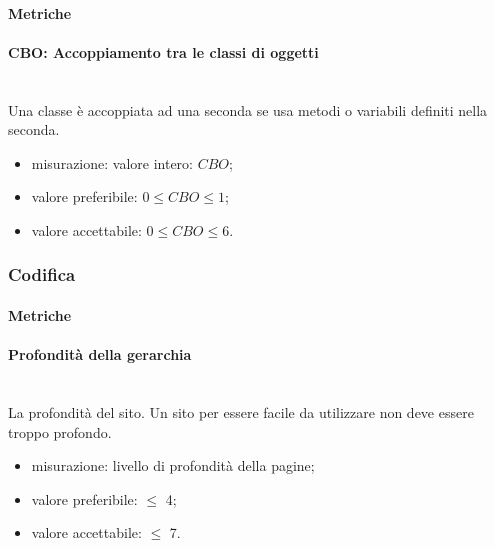 		\paragraph{Metriche}
			\paragraph*{CBO: Accoppiamento tra le classi di oggetti} \mbox{}\\
			Una classe è accoppiata ad una seconda se usa metodi o variabili definiti nella seconda. 
			\begin{itemize}
				\item misurazione: valore intero: $CBO$;
				\item valore preferibile: $0 \leq CBO \leq 1$;
				\item valore accettabile: $0 \leq CBO \leq 6$.
			\end{itemize}
		
	\subsubsection{Codifica}
		\paragraph{Metriche}
			\paragraph*{Profondità della gerarchia} \mbox{}\\
			La profondità del sito. Un sito per essere facile da utilizzare non deve essere troppo profondo.
			\begin{itemize}
				\item misurazione: livello di profondità della pagine;
				\item valore preferibile: $\leq$ 4;
				\item valore accettabile: $\leq$ 7.
			\end{itemize}
			
			\begin{comment}
			\paragraph*{Rapporto di linee di codice per linee di commento}
			 \mbox{}\\
			Il rapporto tra le linee di codice
			e le linee di commento, escludendo le righe vuote.
			\begin{itemize}
				\item misurazione: $\frac{\mbox{linee di codice}}{\mbox{linee di commento}}$;
				\item valore preferibile: $\geq 0.30$;
				\item valore accettabile: $\geq 0.25$.
			\end{itemize}
			\end{comment}
			
